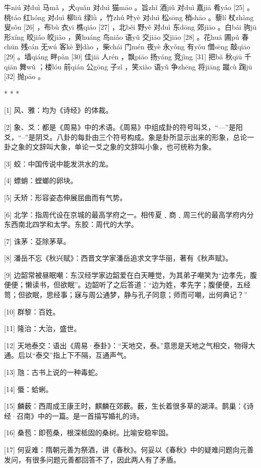 \documentclass[12pt,UTF8]{ctexbook}
\begin{document}
牛niú 对duì 马mǎ ，犬quǎn 对duì 猫māo 。旨zhǐ 酒jiǔ 对duì 嘉jiā 肴yáo [25] 。桃táo 红hóng 对duì 柳liǔ 绿lǜ ，竹zhú 叶yè 对duì 松sōng 梢shāo 。藜lí 杖zhàng 叟sǒu [26] ，布bù 衣yī 樵qiáo [27] ，北běi 野yě 对duì 东dōng 郊jiāo 。白bái 驹jū 形xíng 皎jiǎo 皎jiǎo ，黄huáng 鸟niǎo 语yǔ 交jiāo 交jiāo [28] 。花huā 圃pǔ 春chūn 残cán 无wú 客kè 到dào ，柴chái 门mén 夜yè 永yǒng 有yǒu 僧sēng 敲qiāo [29] 。墙qiáng 畔pàn [30] 佳jiā 人rén ，飘piāo 扬yáng 竞jìng [31] 把bǎ 秋qiū 千qiān 舞wǔ ；楼lóu 前qián 公gōng 子zǐ ，笑xiào 语yǔ 争zhēng 将jiāng 蹴cù 踘jū [32] 抛pāo 。



* * *



[1] 风、雅：均为《诗经》的体裁。

[2] 象、爻：都是《周易》中的术语。《周易》中组成卦的符号叫爻，“—”是阳爻，“--”是阴爻。八卦的每卦由三个符号构成。象是卦所显示出来的形象，总论一卦之象的文辞叫大象，单论一爻之象的文辞叫小象，也可统称为象。

[3] 蛟：中国传说中能发洪水的龙。

[4] 螵蛸：螳螂的卵块。

[5] 夭矫：形容姿态伸展屈曲而有气势。

[6] 北学：指周代设在京城的最高学府之一。相传夏﹑商﹑周三代的最高学府内分东西南北四学和太学。东胶：周代的大学。

[7] 诛茅：芟除茅草。

[8] 潘岳不忘《秋兴赋》：西晋文学家潘岳追求文字华丽，著有《秋声赋》。

[9] 边韶常被昼眠嘲：东汉经学家边韶爱在白天睡觉，为其弟子嘲笑为“边孝先，腹便便；懒读书，但欲眠”。边韶听了之后答道：“边为姓，孝先字；腹便便，五经笥；但欲眠，思经事；寐与周公通梦，静与孔子同意；师而可嘲，出何典记？”

[10] 群黎：百姓。

[11] 隆治：大治，盛世。

[12] 天地泰交：语出《周易·泰卦》：“天地交，泰。”意思是天地之气相交，物得大通。后以“泰交”指上下不隔，互通声气。

[13] 虺：古书上说的一种毒蛇。

[14] 蜃：蛤蜊。

[15] 麟薮：西周成王康王时，麒麟在郊薮。薮，生长着很多草的湖泽。鹊巢：《诗经·召南》中的一篇。是一首描写婚礼的诗。

[16] 桑苞：即苞桑，根深柢固的桑树。比喻安稳牢固。

[17] 何妥难：隋朝元善为祭酒，讲《春秋》。何妥以《春秋》中的疑难问题向元善发问，有很多问题元善都回答不了，因此两人有了矛盾。
\end{document}
